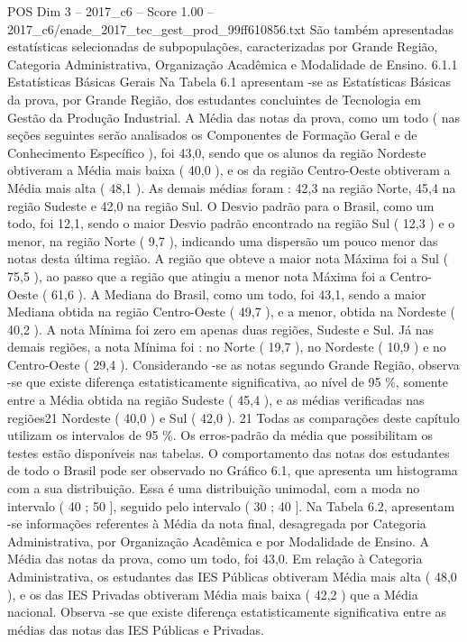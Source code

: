 \begin{textsample}{POS Dim 3 – 2017\_c6 – Score 1.00 – 2017\_c6/enade\_2017\_tec\_gest\_prod\_99ff610856.txt}
São também apresentadas estatísticas selecionadas de subpopulações, caracterizadas por Grande Região, Categoria Administrativa, Organização Acadêmica e Modalidade de Ensino. 6.1.1 Estatísticas Básicas Gerais Na Tabela 6.1 apresentam -se as Estatísticas Básicas da prova, por Grande Região, dos estudantes concluintes de Tecnologia em Gestão da Produção Industrial.
A Média das notas da prova, como um todo ( nas seções seguintes serão analisados os Componentes de Formação Geral e de Conhecimento Específico ), foi 43,0, sendo que os alunos da região Nordeste obtiveram a Média mais baixa ( 40,0 ), e os da região Centro-Oeste obtiveram a Média mais alta ( 48,1 ).
As demais médias foram : 42,3 na região Norte, 45,4 na região Sudeste e 42,0 na região Sul.
O Desvio padrão para o Brasil, como um todo, foi 12,1, sendo o maior Desvio padrão encontrado na região Sul ( 12,3 ) e o menor, na região Norte ( 9,7 ), indicando uma dispersão um pouco menor das notas desta última região.
A região que obteve a maior nota Máxima foi a Sul ( 75,5 ), ao passo que a região que atingiu a menor nota Máxima foi a Centro-Oeste ( 61,6 ).
A Mediana do Brasil, como um todo, foi 43,1, sendo a maior Mediana obtida na região Centro-Oeste ( 49,7 ), e a menor, obtida na Nordeste ( 40,2 ).
A nota Mínima foi zero em apenas duas regiões, Sudeste e Sul.
Já nas demais regiões, a nota Mínima foi : no Norte ( 19,7 ), no Nordeste ( 10,9 ) e no Centro-Oeste ( 29,4 ).
Considerando -se as notas segundo Grande Região, observa -se que existe diferença estatisticamente significativa, ao nível de 95 \%, somente entre a Média obtida na região Sudeste ( 45,4 ), e as médias verificadas nas regiões21 Nordeste ( 40,0 ) e Sul ( 42,0 ). 21 Todas as comparações deste capítulo utilizam os intervalos de 95 \%.
Os erros-padrão da média que possibilitam os testes estão disponíveis nas tabelas.
O comportamento das notas dos estudantes de todo o Brasil pode ser observado no Gráfico 6.1, que apresenta um histograma com a sua distribuição.
Essa é uma distribuição unimodal, com a moda no intervalo ( 40 ; 50 ], seguido pelo intervalo ( 30 ; 40 ].
Na Tabela 6.2, apresentam -se informações referentes à Média da nota final, desagregada por Categoria Administrativa, por Organização Acadêmica e por Modalidade de Ensino.
A Média das notas da prova, como um todo, foi 43,0.
Em relação à Categoria Administrativa, os estudantes das IES Públicas obtiveram Média mais alta ( 48,0 ), e os das IES Privadas obtiveram Média mais baixa ( 42,2 ) que a Média nacional.
Observa -se que existe diferença estatisticamente significativa entre as médias das notas das IES Públicas e Privadas.

\end{textsample}
